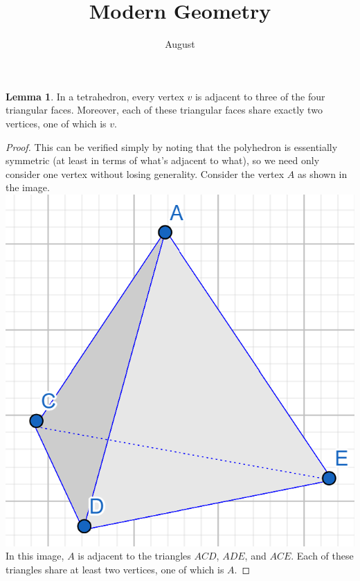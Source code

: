 \documentclass[12pt]{article}
\title{Modern Geometry}
\author{August}
\theoremstyle{definition}
\newtheorem{lemma}{Lemma}
\begin{document}
\maketitle

\begin{lemma}
In a tetrahedron, every vertex $v$ is adjacent to three of the four triangular faces. Moreover, each of these triangular faces share exactly two vertices, one of which is $v$.
\end{lemma}
\begin{proof}
This can be verified simply by noting that the polyhedron is essentially symmetric (at least in terms of what's adjacent to what), so we need only consider one vertex without losing generality. Consider the vertex $A$ as shown in the image.\\

\includegraphics[scale=0.5]{tetrahedron.png}\\

In this image, $A$ is adjacent to the triangles $ACD$, $ADE$, and $ACE$. Each of these triangles share at least two vertices, one of which is $A$. 
\end{proof}
\end{document}
